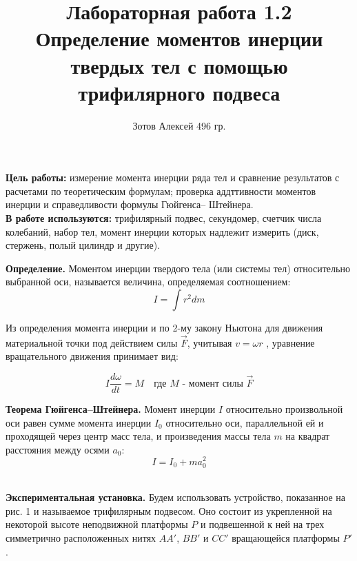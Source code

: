 \documentclass[12pt]{article}
\begin{document}
    \author {Зотов Алексей 496 гр.}
    \title {Лабораторная работа 1.2 \\ Определение моментов инерции твердых тел с помощью трифилярного подвеса}
    \maketitle{}   
    
    \indent
    \textbf{Цель работы:} измерение момента инерции ряда тел и сравнение результатов с расчетами по теоретическим формулам; проверка аддттивности моментов инерции и справедливости формулы Гюйгенса– Штейнера.
    \\\newline
    \indent
    \textbf{В работе используются:} трифилярный подвес, секундомер, счетчик числа колебаний, набор тел, момент инерции которых надлежит измерить (диск, стержень, полый цилиндр и другие).
    \\\newline
    
    \textbf{Определение.} Моментом инерции твердого тела (или системы тел) относительно выбранной оси, называется величина, определяемая соотношением: 
    \begin{equation}
              I = \int r^2dm
    \end{equation} 
    
    Из определения момента инерции и по 2-му закону Ньютона для движения материальной точки под действием силы $\vec{F}$, учитывая $v = \omega r$ , уравнение вращательного движения принимает вид:

    \begin{equation}
              I \frac{d\omega}{dt} = M \quad \text{где $M$ - момент силы $\vec{F}$}
    \end{equation} 

    \textbf{Теорема Гюйгенса–Штейнера.} Момент инерции $I$ относительно произвольной оси равен сумме момента инерции $I_0$ относительно оси, параллельной ей и проходящей через центр масс тела, и произведения массы тела $m$ на квадрат расстояния между осями $a_0$:
    \begin{equation}
        I = I_0 + ma^2_0
    \end{equation} \\\newline

    \textbf{Экспериментальная установка.} Будем использовать устройство, показанное на рис. 1 и называемое трифилярным подвесом. Оно состоит из укрепленной на некоторой высоте неподвижной платформы $P$ и подвешенной к ней на трех симметрично расположенных нитях $AA'$, $BB'$ и $CC'$ вращающейся платформы $P'$.
\end{document}
